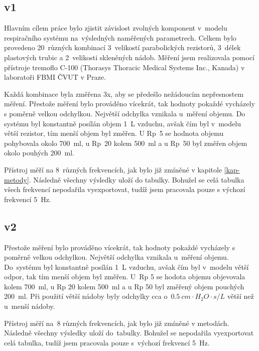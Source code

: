 \subsection{v1}
Hlavním cílem práce bylo zjistit závislost zvolných komponent v~modelu respiračního systému na~výsledných naměřených parametrech.  Celkem bylo provedeno 20~různých kombinací 3~velikostí parabolických rezistorů, 3~délek plastových trubic a 2~velikosti skleněných nádob. Měření jsem realizovala pomocí přístroje tremoflo C-100 (Thorasys Thoracic Medical Systems Inc., Kanada) v laboratoři FBMI ČVUT v Praze. 

Každá kombinace byla změřena 3x, aby se předešlo nežádoucím nepřesnostem měření. Přestože měření bylo prováděno vícekrát, tak hodnoty pokaždé vycházely s poměrně velkou odchylkou. Největší odchylka vznikala u~měření objemu. Do systému byl konstantně posílán objem \SI{1}{L} vzduchu, avšak čím byl v~modelu větší rezistor,  tím menší objem byl změřen. U Rp~5 se hodnota objemu pohybovala okolo  \SI{700}{ml}, u Rp~20 kolem  \SI{500}{ml} a u Rp~50 byl změřen objem okolo pouhých \SI{200}{ml}.

Přístroj měří na 8~různých frekvencích, jak bylo již zmíněné v kapitole \ref{kap-metody}. Následně všechny výsledky uloží do tabulky. Bohužel se  celá tabulka všech frekvencí nepodařila vyexportovat, tudíž jsem pracovala pouze s výchozí frekvencí  \SI{5}{Hz}. 

\subsection{v2}
Přestože měření bylo prováděno vícekrát, tak hodnoty pokaždé vycházely s poměrně velkou odchylkou. Největší odchylka vznikala u~měření objemu. Do~systému byl konstantně posílán \SI{1}{L} vzduchu, avšak čím byl v~modelu větší odpor, tak tím menší objem byl změřen. U~Rp 5 se hodota objemu objevovala kolem \SI{700}{ml}, u Rp 20 kolem \SI{500}{ml} a u Rp 50 byl změřený objem pouchých \SI{200}{ml}. Při použití větší nádoby byly odchylky cca o~$\SI{0,5}{ cm\cdot H_{2}O \cdot s/L} $ větší než u~menší nádoby. 

Přístroj měří na~8 různých frekvencích, jak bylo již zmíněné v metodách. Následně všechny výsledky uloží do~tabulky. Bohužel se nepodařila vyexportovat celá tabulka, tudíž jsem pracovala pouze s~výchozí frekvencí  \SI{5}{Hz}. 

